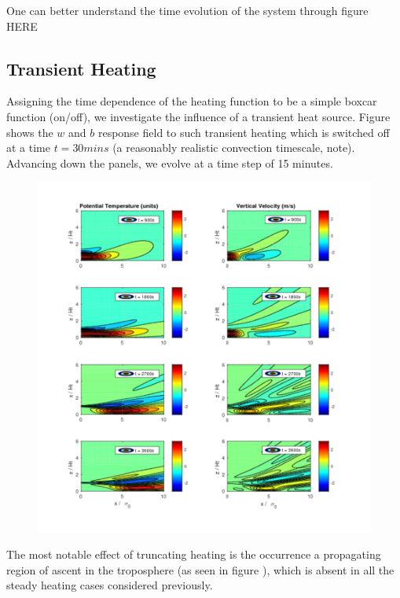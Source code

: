 \documentclass[a4paper,10pt]{article}
\begin{document}
One can better understand the time evolution of the system through figure HERE

\subsection{Transient Heating}
Assigning the time dependence of the heating function to be a simple boxcar function (on/off), we
investigate the influence of a transient heat source. Figure
 shows the $w$ and $b$ response
field to such transient heating which is switched off at a time $t = 30mins$ (a reasonably
realistic convection timescale, note). Advancing down the panels, we evolve at a time step of 15
minutes.

\begin{figure}
  \caption{}
  \centering
    \includegraphics[width=1\textwidth]{Transient_vertical_cross.pdf}
  \label{vertical_cross_transient}
\end{figure}


The most notable effect of truncating heating is the occurrence a propagating region of ascent in
the troposphere (as seen in figure ), which is absent in all
the steady heating cases considered previously. 
\end{document}
